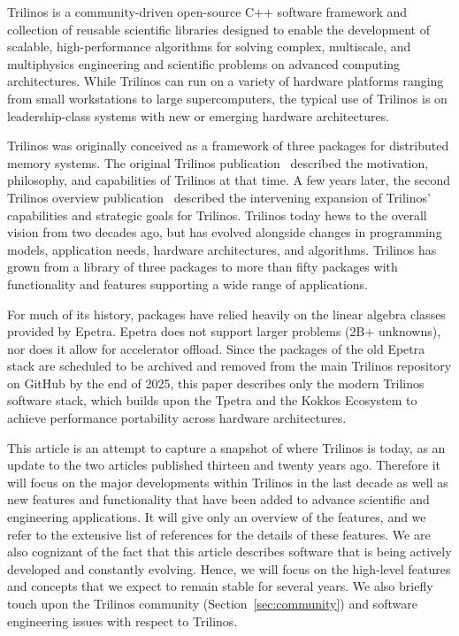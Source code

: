 
Trilinos is a community-driven open-source C++ software framework and collection of reusable scientific libraries designed to enable the development of scalable, high-performance algorithms for solving complex, multiscale, and multiphysics engineering and scientific problems on advanced computing architectures.
While Trilinos can run on a variety of hardware platforms ranging from small workstations to large supercomputers, the typical use of Trilinos is on leadership-class systems with new or emerging hardware architectures.

Trilinos was originally conceived as a framework of three packages for distributed memory systems. The original Trilinos publication~\cite{Heroux2005a} described the motivation, philosophy, and capabilities of Trilinos at that time. A few years later, the second Trilinos overview publication~\cite{Heroux2012} described the intervening expansion of Trilinos' capabilities and strategic goals for Trilinos. Trilinos today hews to the overall vision from two decades ago, but has evolved alongside changes in programming models, application needs, hardware architectures, and algorithms. Trilinos has grown from a library of three packages to more than fifty packages with functionality and features supporting a wide range of applications.

For much of its history, packages have relied heavily on the linear algebra classes provided by Epetra.
Epetra does not support larger problems (2B+ unknowns), nor does it allow for accelerator offload.
Since the packages of the old Epetra stack are scheduled to be archived and removed from the main Trilinos repository on GitHub by the end of 2025, this paper describes only the modern Trilinos software stack, which builds upon the Tpetra and the Kokkos Ecosystem to achieve performance portability across hardware architectures.

This article is an attempt to capture a snapshot of where Trilinos is today, as an update to the two articles published thirteen and twenty years ago.
Therefore it will focus on the major developments within Trilinos in the last decade as well as new features and functionality that have been added to advance scientific and engineering applications.
It will give only an overview of the features, and we refer to the extensive list of references for the details of these features.
We are also cognizant of the fact that this article describes software that is being actively developed and constantly evolving.
Hence, we will focus on the high-level features and concepts that we expect to remain stable for several years.
We also briefly touch upon the Trilinos community (Section~\ref{sec:community}) and software engineering issues with respect to Trilinos.

